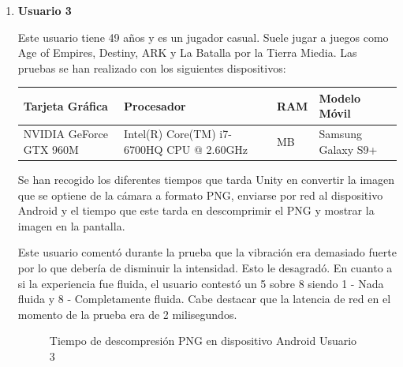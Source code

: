 \begin{enumerate}
\item \textbf{Usuario 3}

Este usuario tiene 49 a\~nos y es un jugador casual. Suele jugar a juegos como Age of Empires, Destiny, ARK y La Batalla por la Tierra Miedia.
Las pruebas se han realizado con los siguientes dispositivos: \\

\begin{tabularx}{1.0\textwidth} { 
  | >{\centering\arraybackslash}X 
  | >{\centering\arraybackslash}X 
  | >{\centering\arraybackslash}X 
  | >{\centering\arraybackslash}X | }
 \hline
 \textbf{Tarjeta Gr\'afica} & \textbf{Procesador} & \textbf{RAM} & \textbf{Modelo M\'ovil} \\
 \hline
 NVIDIA GeForce GTX 960M  & Intel(R) Core(TM) i7-6700HQ CPU @ 2.60GHz  & 16289 MB & Samsung Galaxy S9+  \\
\hline
\end{tabularx}


Se han recogido los diferentes tiempos que tarda Unity en convertir la imagen que se optiene de la c\'amara a formato PNG, enviarse por red al dispositivo Android y el tiempo que este tarda en descomprimir el PNG y mostrar la imagen en la pantalla. 

Este usuario coment\'o durante la prueba que la vibraci\'on era demasiado fuerte por lo que deber\'ia de disminuir la intensidad. Esto le desagrad\'o. En cuanto a si la experiencia fue fluida, el usuario contest\'o un 5 sobre 8 siendo 1 - Nada fluida y 8 - Completamente fluida. Cabe destacar que la latencia de red en el momento de la prueba era de 2 milisegundos.

\begin{figure}[!h]
\centering
{}%
\caption{Tiempo de descompresi\'on PNG en dispositivo Android Usuario 3}
\end{figure}


\end{enumerate}
